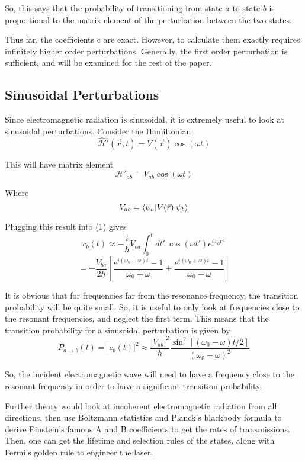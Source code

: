 \documentclass{article}
\renewcommand{\H}{\mathcal{H}}
\begin{document}
So, this says that the probability of transitioning from state $a$ to state $b$ is proportional to the matrix element of the perturbation between the two states.

Thus far, the coefficients c are exact. However, to calculate them exactly requires infinitely higher order perturbations. Generally, the first order perturbation is sufficient, and will be examined for the rest of the paper.

\subsection*{Sinusoidal Perturbations}

Since electromagnetic radiation is sinusoidal, it is extremely useful to look at sinusoidal perturbations. Consider the Hamiltonian
\[ \hat{\H}'(\vec{r},t) = V(\vec{r})\cos(\omega t) \]

This will have matrix element 
\[ \H'_{ab} = V_{ab}\cos(\omega t) \]

Where 
\[ V_{ab} = \braket{\psi_a|V(\vec{r})|\psi_b} \]

Plugging this result into (1) gives
\[ c_b(t) \approx -\frac{i}{\hbar}V_{ba}\int_0^tdt'\ \cos(\omega t')e^{i\omega_0t''}  \]
\[ = -\frac{V_{ba}}{2\hbar}\left[ \frac{e^{i(\omega_0+\omega)t}-1}{\omega_0+\omega} + \frac{e^{i(\omega_0+\omega)t}-1}{\omega_0-\omega} \right] \]

It is obvious that for frequencies far from the resonance frequency, the transition probability will be quite small. So, it is useful to only look at frequencies close to the resonant frequencies, and neglect the first term. This means that the transition probability for a sinusoidal perturbation is given by 
\[ P_{a\to b}(t) = |c_b(t)|^2 \approx \frac{|V_{ab}|^2}{\hbar}\frac{\sin^2\left[(\omega_0-\omega)t/2\right]}{(\omega_0-\omega)^2} \]

So, the incident electromagnetic wave will need to have a frequency close to the resonant frequency in order to have a significant transition probability.

Further theory would look at incoherent electromagnetic radiation from all directions, then use Boltzmann statistics and Planck's blackbody formula to derive Einstein's famous A and B coefficients to get the rates of transmissions. Then, one can get the lifetime and selection rules of the states, along with Fermi's golden rule to engineer the laser.


\end{document}
